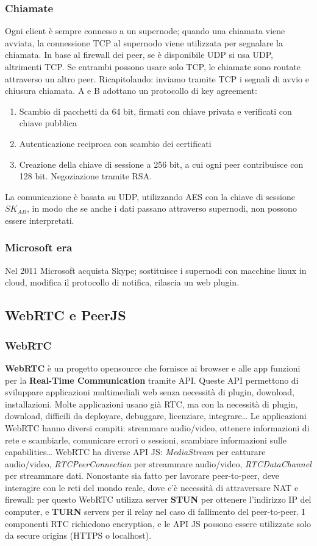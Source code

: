 \documentclass[11pt]{article}
\begin{document}
\subsubsection{Chiamate} Ogni client è sempre connesso a un supernode; quando una chiamata viene avviata, la connessione TCP al supernodo viene utilizzata per segnalare la chiamata. In base al firewall dei peer, se è disponibile UDP si usa UDP, altrimenti TCP. Se entrambi possono usare solo TCP, le chiamate sono routate attraverso un altro peer. Ricapitolando: inviamo tramite TCP i segnali di avvio e chiusura chiamata. A e B adottano un protocollo di key agreement:
\begin{enumerate}
    \item Scambio di pacchetti da 64 bit, firmati con chiave privata e verificati con chiave pubblica
    \item Autenticazione reciproca con scambio dei certificati 
    \item Creazione della chiave di sessione a 256 bit, a cui ogni peer contribuisce con 128 bit. Negoziazione tramite RSA.
\end{enumerate}
La comunicazione è basata su UDP, utilizzando AES con la chiave di sessione $SK_{AB}$, in modo che se anche i dati passano attraverso supernodi, non possono essere interpretati. 
\subsubsection{Microsoft era} Nel 2011 Microsoft acquista Skype; sostituisce i supernodi con macchine linux in cloud, modifica il protocollo di notifica, rilascia un web plugin.
\subsection{WebRTC e PeerJS}
\subsubsection{WebRTC} \textbf{WebRTC} è un progetto opensource che fornisce ai browser e alle app funzioni per la \textbf{Real-Time Communication} tramite API. Queste API permettono di sviluppare applicazioni multimediali web senza necessità di plugin, download, installazioni. Molte applicazioni usano già RTC, ma con la necessità di plugin, download, difficili da deployare, debuggare, licenziare, integrare\dots
Le applicazioni WebRTC hanno diversi compiti: stremmare audio/video, ottenere informazioni di rete e scambiarle, comunicare errori o sessioni, scambiare informazioni sulle capabilities\dots
WebRTC ha diverse API JS: \textit{MediaStream} per catturare audio/video, \textit{RTCPeerConnection} per streammare audio/video, \textit{RTCDataChannel} per streammare dati. Nonostante sia fatto per lavorare peer-to-peer, deve interagire con le reti del mondo reale, dove c'è necessità di attraversare NAT e firewall: per questo WebRTC utilizza server \textbf{STUN} per ottenere l'indirizzo IP del computer, e \textbf{TURN} servers per il relay nel caso di fallimento del peer-to-peer. I componenti RTC richiedono encryption, e le API JS possono essere utilizzate solo da secure origins (HTTPS o localhost). 
\end{document}
